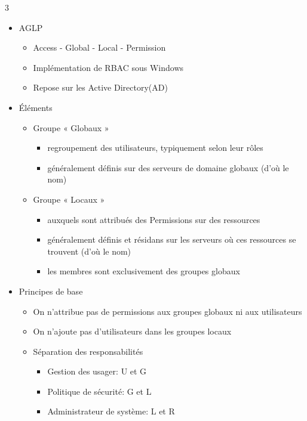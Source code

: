 \documentclass[9pt, a4paper, twoside]{article}
\begin{document}
\begin{multicols}{3}
\begin{itemize}[label=$\bullet$]
    \item \scriptsize AGLP
    \begin{itemize}[label=$\circ$]
        \item \scriptsize Access - Global - Local - Permission
        \item \scriptsize Implémentation de RBAC sous Windows
        \item \scriptsize Repose sur les Active Directory(AD)
    \end{itemize}
    \item \scriptsize Éléments
    \begin{itemize}[label=$\circ$]
        \item \scriptsize Groupe « Globaux »
        \begin{itemize}[label=$\bullet$]
            \item \scriptsize regroupement des utilisateurs, typiquement selon leur rôles
            \item \scriptsize généralement définis sur des serveurs de domaine globaux (d'où le nom)
        \end{itemize}
        \item \scriptsize Groupe « Locaux »
        \begin{itemize}[label=$\bullet$]
            \item \scriptsize auxquels sont attribués des Permissions sur des ressources
            \item \scriptsize généralement définis et résidans sur les serveurs où ces ressources se trouvent (d'où le nom)
            \item \scriptsize les membres sont exclusivement des groupes globaux
        \end{itemize}
    \end{itemize}
    \item \scriptsize Principes de base
    \begin{itemize}[label=$\circ$]
        \item \scriptsize On n'attribue pas de permissions aux groupes globaux ni aux utilisateurs
        \item \scriptsize On n'ajoute pas d'utilisateurs dans les groupes locaux
        \item \scriptsize Séparation des responsabilités
        \begin{itemize}[label={}]
            \item \scriptsize Gestion des usager: U et G
            \item \scriptsize Politique de sécurité: G et L
            \item \scriptsize Administrateur de système: L et R
        \end{itemize}
    \end{itemize}
\end{itemize}


\end{multicols}
\end{document}
